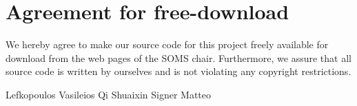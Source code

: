 \section*{Agreement for free-download}
\bigskip

\bigskip

\large We hereby agree to make our source code for this project freely available for download from the web pages of the SOMS chair. Furthermore, we assure that all source code is written by ourselves and is not violating any copyright restrictions.

\begin{center}
	\bigskip
	\bigskip

	Lefkopoulos Vasileios \hspace{2cm} Qi Shuaixin \hspace{2cm} Signer Matteo
\end{center}

\clearpage
